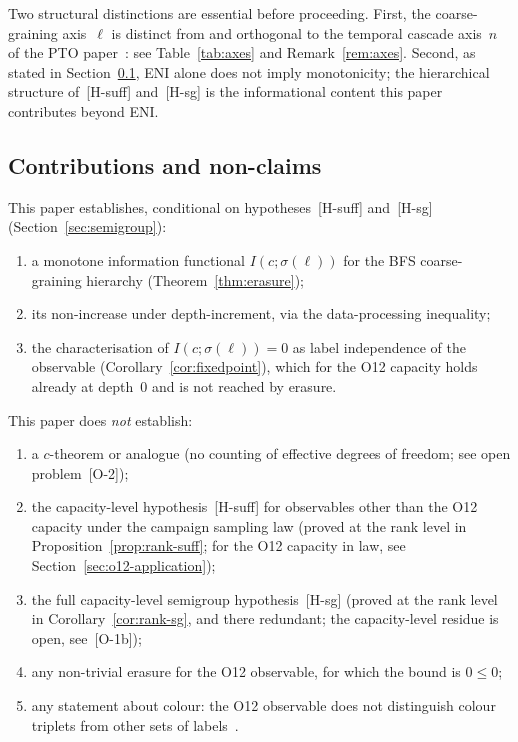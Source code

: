 \documentclass[11pt,a4paper]{article}
\theoremstyle{plain}
\theoremstyle{definition}
\theoremstyle{remark}
\begin{document}
    Two structural distinctions are essential before proceeding.
    First, the coarse-graining axis~$\ell$ is distinct from and orthogonal to
    the temporal cascade axis~$n$ of the PTO paper~\cite{Beau2026pto}:
    see Table~\ref{tab:axes} and Remark~\ref{rem:axes}.
    Second, as stated in Section~\ref{sec:claims}, ENI alone does not imply monotonicity;
    the hierarchical structure of~\textup{[H-suff]} and~\textup{[H-sg]} is
    the informational content this paper contributes beyond ENI.

    \subsection{Contributions and non-claims}
      \label{sec:claims}

      This paper establishes, conditional on hypotheses~\textup{[H-suff]}
      and~\textup{[H-sg]} (Section~\ref{sec:semigroup}):
      \begin{enumerate}[label=(\roman*)]
\item a monotone information functional $I(c;\sigma(\ell))$
for the BFS coarse-graining hierarchy (Theorem~\ref{thm:erasure});
\item its non-increase under depth-increment, via the data-processing inequality;
\item the characterisation of $I(c;\sigma(\ell)) = 0$ as label independence of the observable
(Corollary~\ref{cor:fixedpoint}), which for the O12 capacity holds already at depth~$0$ and is
not reached by erasure.
      \end{enumerate}
      This paper does \emph{not} establish:
      \begin{enumerate}[label=(\roman*)]
\item a $c$-theorem or analogue (no counting of effective degrees of freedom;
see open problem~\textup{[O-2]});
\item the capacity-level hypothesis~\textup{[H-suff]} for observables other than the O12
capacity under the campaign sampling law (proved at the rank level in
Proposition~\ref{prop:rank-suff}; for the O12 capacity in law, see
Section~\ref{sec:o12-application});
\item the full capacity-level semigroup hypothesis~\textup{[H-sg]}
(proved at the rank level in Corollary~\ref{cor:rank-sg}, and there redundant;
the capacity-level residue is open, see~\textup{[O-1b]});
\item any non-trivial erasure for the O12 observable, for which the bound is $0 \leq 0$;
\item any statement about colour: the O12 observable does not distinguish colour triplets
from other sets of labels~\cite{Beau2026a36}.
      \end{enumerate}
\end{document}
